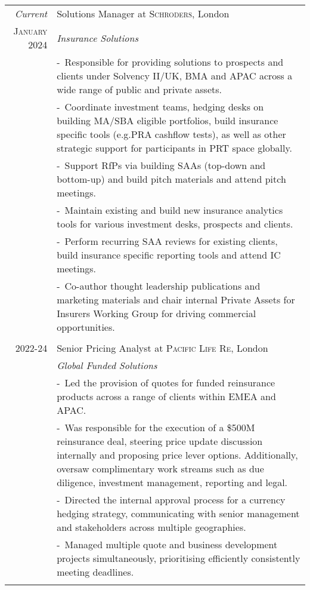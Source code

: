 \documentclass[a4paper,10pt]{article}
\newcommand{\blankline}{\multicolumn{1}{c}{}\\}
\newcommand{\projectitem}{\footnotesize-~\ignorespaces}
\begin{document}
\begin{tabularx}{\textwidth}{@{}r|>{\raggedright\arraybackslash}X@{}}
  \emph{Current} &Solutions Manager at \textsc{Schroders}, London \\
 \textsc{January 2024} & \emph{Insurance Solutions}\\
& \projectitem Responsible for providing solutions to prospects and clients under Solvency II/UK, BMA and APAC across a wide range of public and private assets.\\
 & \projectitem Coordinate investment teams, hedging desks on building MA/SBA eligible portfolios, build insurance specific tools (e.g.PRA cashflow tests), as well as other strategic support for participants in PRT space globally.\\
 & \projectitem Support RfPs via building SAAs (top-down and bottom-up) and build pitch materials and attend pitch meetings.\\
 & \projectitem Maintain existing and build new insurance analytics tools for various investment desks, prospects and clients.\\
 & \projectitem Perform recurring SAA reviews for existing clients, build insurance specific reporting tools and attend IC meetings.\\
  & \projectitem Co-author thought leadership publications and marketing materials and chair internal Private Assets for Insurers Working Group for driving commercial opportunities. \\
  \blankline

\textsc{2022-24} & Senior Pricing Analyst at \textsc{Pacific Life Re}, London \\
 & \emph{Global Funded Solutions}\\
 & \projectitem Led the provision of quotes for funded reinsurance products across a range of clients within EMEA and APAC. \\
  & \projectitem Was responsible for the execution of a \$500M reinsurance deal, steering price update discussion internally and proposing price lever options. Additionally, oversaw complimentary work streams such as due diligence, investment management, reporting and legal.\\
  & \projectitem Directed the internal approval process for a currency hedging strategy, communicating with senior management and stakeholders across multiple geographies. \\
  & \projectitem Managed multiple quote and business development projects simultaneously, prioritising efficiently consistently meeting deadlines.\\
  \blankline


\end{tabularx}
\end{document}
